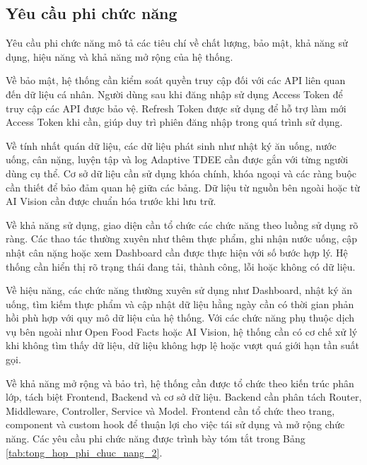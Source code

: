 \documentclass[12pt, a4paper]{report}
\begin{document}
\subsection{Yêu cầu phi chức năng}Yêu cầu phi chức năng mô tả các tiêu chí về chất lượng, bảo mật, khả năng sử dụng, hiệu năng và khả năng mở rộng của hệ thống.

Về bảo mật, hệ thống cần kiểm soát quyền truy cập đối với các API liên quan đến dữ liệu cá nhân. Người dùng sau khi đăng nhập sử dụng Access Token để truy cập các API được bảo vệ. Refresh Token được sử dụng để hỗ trợ làm mới Access Token khi cần, giúp duy trì phiên đăng nhập trong quá trình sử dụng.

Về tính nhất quán dữ liệu, các dữ liệu phát sinh như nhật ký ăn uống, nước uống, cân nặng, luyện tập và log Adaptive TDEE cần được gắn với từng người dùng cụ thể. Cơ sở dữ liệu cần sử dụng khóa chính, khóa ngoại và các ràng buộc cần thiết để bảo đảm quan hệ giữa các bảng. Dữ liệu từ nguồn bên ngoài hoặc từ AI Vision cần được chuẩn hóa trước khi lưu trữ.

Về khả năng sử dụng, giao diện cần tổ chức các chức năng theo luồng sử dụng rõ ràng. Các thao tác thường xuyên như thêm thực phẩm, ghi nhận nước uống, cập nhật cân nặng hoặc xem Dashboard cần được thực hiện với số bước hợp lý. Hệ thống cần hiển thị rõ trạng thái đang tải, thành công, lỗi hoặc không có dữ liệu.

Về hiệu năng, các chức năng thường xuyên sử dụng như Dashboard, nhật ký ăn uống, tìm kiếm thực phẩm và cập nhật dữ liệu hằng ngày cần có thời gian phản hồi phù hợp với quy mô dữ liệu của hệ thống. Với các chức năng phụ thuộc dịch vụ bên ngoài như Open Food Facts hoặc AI Vision, hệ thống cần có cơ chế xử lý khi không tìm thấy dữ liệu, dữ liệu không hợp lệ hoặc vượt quá giới hạn tần suất gọi.

Về khả năng mở rộng và bảo trì, hệ thống cần được tổ chức theo kiến trúc phân lớp, tách biệt Frontend, Backend và cơ sở dữ liệu. Backend cần phân tách Router, Middleware, Controller, Service và Model. Frontend cần tổ chức theo trang, component và custom hook để thuận lợi cho việc tái sử dụng và mở rộng chức năng. Các yêu cầu phi chức năng được trình bày tóm tắt trong Bảng \ref{tab:tong_hop_phi_chuc_nang_2}.
\end{document}
